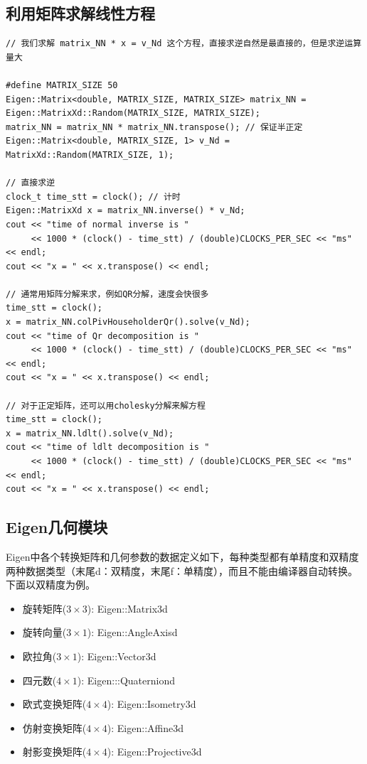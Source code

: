 \subsection{利用矩阵求解线性方程}
\begin{lstlisting}[style=C++]
// 我们求解 matrix_NN * x = v_Nd 这个方程，直接求逆自然是最直接的，但是求逆运算量大

#define MATRIX_SIZE 50
Eigen::Matrix<double, MATRIX_SIZE, MATRIX_SIZE> matrix_NN = Eigen::MatrixXd::Random(MATRIX_SIZE, MATRIX_SIZE);
matrix_NN = matrix_NN * matrix_NN.transpose(); // 保证半正定
Eigen::Matrix<double, MATRIX_SIZE, 1> v_Nd = MatrixXd::Random(MATRIX_SIZE, 1);

// 直接求逆
clock_t time_stt = clock(); // 计时
Eigen::MatrixXd x = matrix_NN.inverse() * v_Nd;
cout << "time of normal inverse is "
     << 1000 * (clock() - time_stt) / (double)CLOCKS_PER_SEC << "ms" << endl;
cout << "x = " << x.transpose() << endl;

// 通常用矩阵分解来求，例如QR分解，速度会快很多
time_stt = clock();
x = matrix_NN.colPivHouseholderQr().solve(v_Nd);
cout << "time of Qr decomposition is "
     << 1000 * (clock() - time_stt) / (double)CLOCKS_PER_SEC << "ms" << endl;
cout << "x = " << x.transpose() << endl;

// 对于正定矩阵，还可以用cholesky分解来解方程
time_stt = clock();
x = matrix_NN.ldlt().solve(v_Nd);
cout << "time of ldlt decomposition is "
     << 1000 * (clock() - time_stt) / (double)CLOCKS_PER_SEC << "ms" << endl;
cout << "x = " << x.transpose() << endl;
\end{lstlisting}



\subsection{Eigen几何模块}

Eigen中各个转换矩阵和几何参数的数据定义如下，每种类型都有单精度和双精度两种数据类型（末尾d：双精度，末尾f：单精度），而且不能由编译器自动转换。下面以双精度为例。
\begin{itemize}[itemsep=0.1pt,topsep =2pt]
    \item 旋转矩阵($3 \times 3$): \quad Eigen::Matrix3d
    \item 旋转向量($3 \times 1$): \quad Eigen::AngleAxisd
    \item 欧拉角($3 \times 1$): \quad Eigen::Vector3d
    \item 四元数($4 \times 1$): \quad Eigen:::Quaterniond
    \item 欧式变换矩阵($4 \times 4$): \quad Eigen::Isometry3d
    \item 仿射变换矩阵($4 \times 4$): \quad Eigen::Affine3d
    \item 射影变换矩阵($4 \times 4$): \quad Eigen::Projective3d
\end{itemize}














